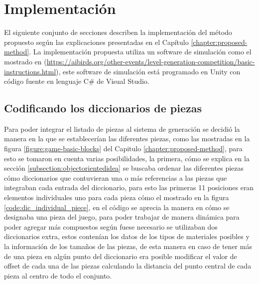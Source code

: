 \chapter{Implementación}
\label{chapter:implementation}

El siguiente conjunto de secciones describen la implementación del método
propuesto según las explicaciones presentadas en el Capítulo
\ref{chapter:proposed-method}. La implementación propuesta utiliza un software
de simulación como el mostrado en \cite{Renz2013}
(\url{https://aibirds.org/other-events/level-generation-competition/basic-instructions.html}),
este software de simulación está programado en Unity con código fuente en
lenguaje C\# de Visual Studio.

\section{Codificando los diccionarios de piezas}
\label{section:piece_dictionary}

Para poder integrar el listado de piezas al
sistema de generación se decidió la manera en la que se establecerían las
diferentes piezas, como las mostradas en la figura \ref{figure:game-basic-blocks}
del Capitulo \ref{chapter:proposed-method}, para esto se tomaron en cuenta
varias posibilidades, la primera, cómo se explica en la sección
\ref{subsection:objectorientedidea} se buscaba ordenar las diferentes piezas
cómo diccionarios que contuvieran una o más referencias a las piezas que
integraban cada entrada del diccionario, para esto las primeras 11 posiciones
eran elementos individuales uno para cada pieza cómo el mostrado en la figura
\ref{code:dic_individual_piece}, en el código se aprecia la manera en cómo se
designaba una pieza del juego, para poder trabajar de manera dinámica para poder
agregar más compuestos según fuese necesario se utilizaban dos diccionarios
extra, estos contenían los datos de los tipos de materiales posibles y la
información de los tamaños de las piezas, de esta manera en caso de tener más de
una pieza en algún punto del diccionario era posible modificar el valor de
offset de cada una de las piezas calculando la distancia del punto central de
cada pieza al centro de todo el conjunto.

